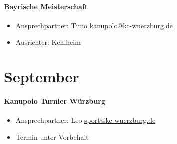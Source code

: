 \documentclass[12pt, a4paper]{report}
\begin{document}
\paragraph{Bayrische Meisterschaft}
\begin{itemize}
    \item Ansprechpartner: Timo \href{mailto:kanupolo@kc-wuerzburg.de}{kanupolo@kc-wuerzburg.de}
    \item Ausrichter: Kehlheim
\end{itemize}

\section*{September}\paragraph{Kanupolo Turnier Würzburg}
\begin{itemize}
    \item Ansprechpartner: Leo \href{mailto:sport@kc-wuerzburg.de}{sport@kc-wuerzburg.de}
    \item Termin unter Vorbehalt
\end{itemize}
\end{document}
